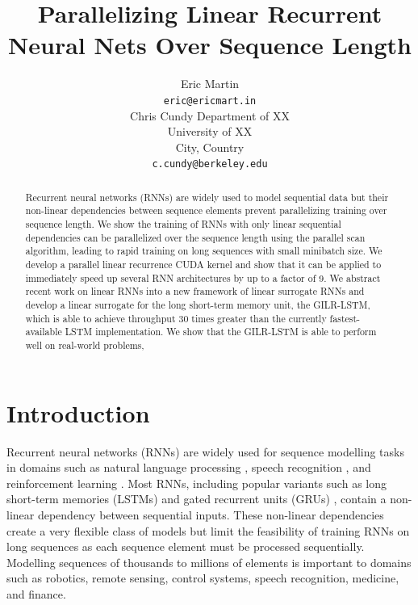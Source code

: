 \documentclass{article}
\title{Parallelizing Linear Recurrent Neural Nets Over Sequence Length}
\author{Eric Martin \\
\texttt{eric@ericmart.in} \\
\And
Chris Cundy
Department of XX \\
University of XX \\
City, Country \\
\texttt{c.cundy@berkeley.edu} \\
}
\begin{document}
\maketitle

\begin{abstract}
Recurrent neural networks (RNNs) are widely used to model sequential data but
their non-linear dependencies between sequence elements prevent parallelizing
training over sequence length. We show the training of RNNs with only linear
sequential dependencies can be parallelized over the sequence length using the
parallel scan algorithm, leading to rapid training on long sequences with small
minibatch size. We develop a
parallel linear recurrence CUDA kernel and show that it can be applied to
immediately speed up several RNN architectures by up to a factor of 9. We abstract
recent work on linear RNNs into a new framework of linear surrogate RNNs and develop
a linear surrogate for the long short-term memory unit, the GILR-LSTM, which is
able to achieve throughput 30 times greater than the currently fastest-available LSTM
implementation. We show that the GILR-LSTM is able to perform well on real-world
problems,
\end{abstract}

\section{Introduction}
Recurrent neural networks (RNNs) are widely used for sequence modelling tasks in
domains such as natural language processing \cite{sutskever2014sequence}, speech
recognition \cite{amodei2015deep}, and reinforcement learning
\cite{hausknecht2015deep}. Most RNNs, including popular variants such as long
short-term memories (LSTMs) \cite{hochreiter1997long} and gated recurrent units
(GRUs) \cite{cho2014learning}, contain a non-linear dependency between
sequential inputs. These non-linear dependencies create a very flexible class of
models but limit the feasibility of training RNNs on long sequences as each
sequence element must be processed sequentially.  Modelling sequences of
thousands to millions of elements is important to domains such as robotics,
remote sensing, control systems, speech recognition, medicine, and finance.
\end{document}
